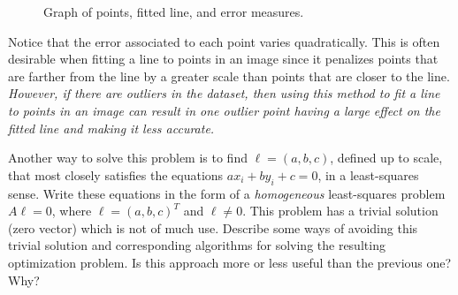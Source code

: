 \begin{problem}
\begin{enumroman}
\begin{answer}
\begin{figure}[H]
          \caption{Graph of points, fitted line, and error measures.}
        \end{figure}
        Notice that the error associated to each point varies quadratically.
        This is often desirable when fitting a line to points in an image
        since it penalizes points that are farther from the line by a
        greater scale than points that are closer to the line.
        \emph{
          However, if there are outliers in the dataset,
          then using this method to fit a line to points in an image
          can result in one outlier point having a large effect on the
          fitted line and making it less accurate.
        } \\
      \end{answer}

    \newpage
    \item Another way to solve this problem is to find
      $\ell = (a, b, c)$, defined up to scale, that
      most closely satisfies the equations $ax_i + by_i + c = 0$,
      in a least-squares sense.
      Write these equations in the form of a \emph{homogeneous}
      least-squares problem $A \ell = 0$, where $\ell = (a, b, c)^T$
      and $\ell \ne 0$.
      This problem has a trivial solution (zero vector) which is not
      of much use. Describe some ways of avoiding this trivial solution
      and corresponding algorithms for solving the resulting
      optimization problem. Is this approach more or less
      useful than the previous one? Why?
      

\end{enumroman}
\end{problem}
